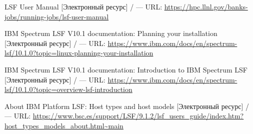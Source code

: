 \begingroup 
\renewcommand{\section}[2]{\anonsection{Библиографический список}}
\begin{thebibliography}{00}



\newcommand*{\addthinspace}{\hskip0.16667em\relax}

    LSF User Manual
    [Электронный ресурс] /
    --- URL: \url{https://hpc.llnl.gov/banks-jobs/running-jobs/lsf-user-manual}

    IBM Spectrum LSF V10.1 documentation: Planning your installation
    [Электронный ресурс] /
    --- URL: \url{https://www.ibm.com/docs/en/spectrum-lsf/10.1.0?topic=linux-planning-your-installation}

    IBM Spectrum LSF V10.1 documentation: Introduction to IBM Spectrum LSF
    [Электронный ресурс] /
    --- URL: \url{https://www.ibm.com/docs/en/spectrum-lsf/10.1.0?topic=overview-lsf-introduction}

    About IBM Platform LSF: Host types and host models
    [Электронный ресурс] /
    --- URL: \url{https://www.bsc.es/support/LSF/9.1.2/lsf_users_guide/index.htm?host_types_models_about.html~main}



\end{thebibliography}
\endgroup

\clearpage